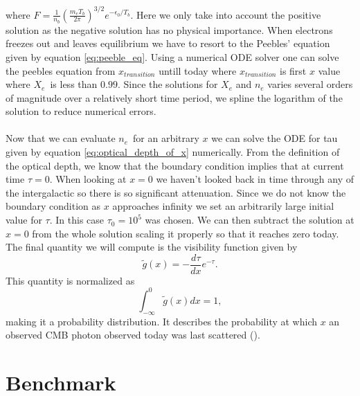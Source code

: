 \documentclass[onecolumn]{aastex62}
\begin{document}
where $F=\frac{1}{n_b} \left(\frac{m_eT_b}{2\pi}\right)^{3/2} e^{-\epsilon_0/T_b}$. Here we only take into account the positive solution as the negative solution has no physical importance. When electrons freezes out and leaves equilibrium we have to resort to the Peebles' equation given by equation \ref{eq:peeble_eq}. Using a numerical ODE solver one can solve the peebles equation from $x_{transition}$ untill today where $x_{transition}$ is first $x$ value where $X_e$ is less than $0.99$. Since the solutions for $X_e$ and $n_e$ varies several orders of magnitude over a relatively short time period, we spline the logarithm of the solution to reduce numerical errors.
\\\\\indent
Now that we can evaluate $n_e$ for an arbitrary $x$ we can solve the ODE for tau given by equation \ref{eq:optical_depth_of_x} numerically. From the definition of the optical depth, we know that the boundary condition implies that at current time $\tau=0$. When looking at $x=0$ we haven't looked back in time through any of the intergalactic so there is so significant attenuation. Since we do not know the boundary condition as $x$ approaches infinity we set an arbitrarily large initial value for $\tau$. In this case $\tau_0=10^5$ was chosen. We can then subtract the solution at $x=0$ from the whole solution scaling it properly so that it reaches zero today. The final quantity we will compute is the visibility function given by
\begin{equation}
    \widetilde{g}(x)=-\frac{d\tau}{dx}e^{-\tau}.
\end{equation}
This quantity is normalized as
\begin{equation}
    \int_{-\infty}^{0} \tilde{g}(x)dx = 1,
\end{equation}
making it a probability distribution. It describes the probability at which $x$ an observed CMB photon observed today was last scattered (\cite{callin2006calculate}).
\label{sec:results}

\section{Benchmark}




\end{document}
